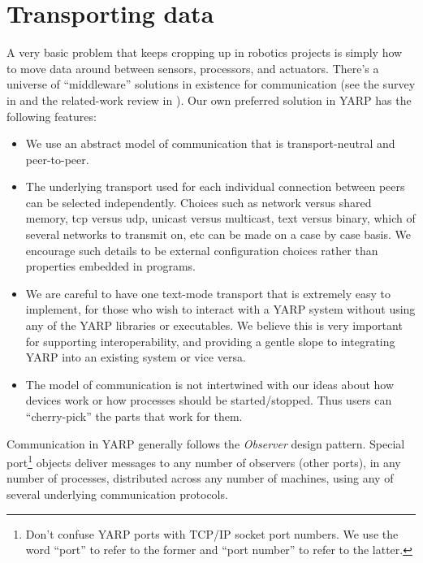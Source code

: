 
\setlength{\doublerulesep}{\arrayrulewidth}



\section{Transporting data}
\label{sec:transporting}

A very basic problem that keeps cropping up in robotics projects is
simply how to move data around between sensors, processors,
and actuators.  There's a universe of ``middleware'' solutions
in existence for communication (see the survey in \cite{kramer2007development}
and the related-work review in \cite{collett2005player}).
%
%
%
Our own preferred solution
in YARP has the following features:

\begin{itemize} \pflist

\item We use an abstract model of communication that is
transport-neutral and peer-to-peer.

\item The underlying transport used for each individual connection
between peers can be selected independently.  Choices such as network
versus shared memory, tcp versus udp, unicast versus multicast, text
versus binary, which of several networks to transmit on, etc can be
made on a case by case basis.  We encourage such details to be
external configuration choices rather than properties embedded in
programs.

\item We are careful to have one text-mode transport that is
extremely easy to implement, for those who wish to interact with a
YARP system without using any of the YARP libraries or executables.
We believe this is very important for supporting interoperability, and
providing a gentle slope to integrating YARP into an existing system
or vice versa.

\item The model of communication is not intertwined with our
ideas about how devices work or how processes should be started/stopped.
Thus users can ``cherry-pick'' the parts that work for them.

\end{itemize}

Communication in YARP generally follows the {\it Observer} design
pattern. Special port\footnote{
Don't confuse YARP ports with TCP/IP socket port numbers.
We use the word 
``port'' to refer to the former and ``port number'' to refer to the latter.
} objects deliver messages to any number of
observers (other ports), in any number of processes, distributed
across any number of machines, using any of several underlying
communication protocols.





